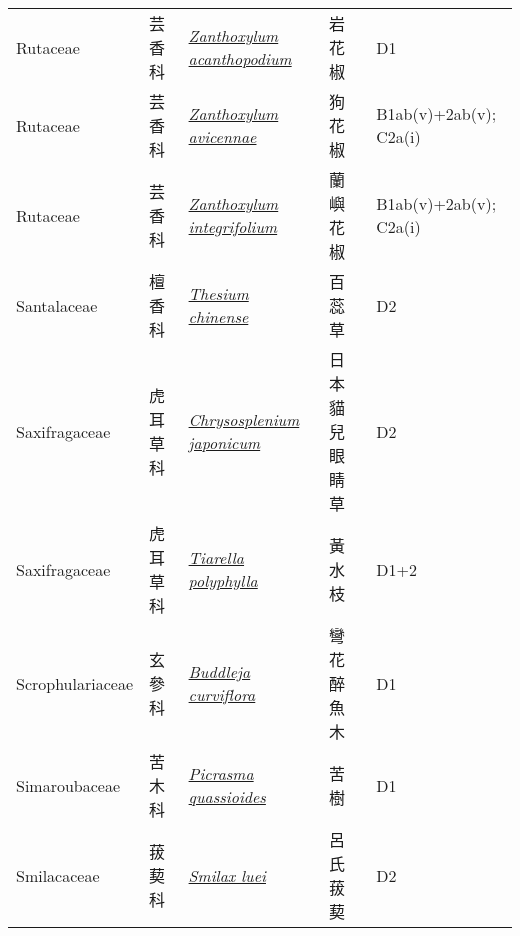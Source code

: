 {\begin{longtable}{L{2.5cm}L{2cm}L{5cm}L{2.5cm}L{3cm}}
    Rutaceae & 芸香科 & \href{http://www.theplantlist.org/tpl1.1/search?q=Zanthoxylum+acanthopodium}{\textit{Zanthoxylum acanthopodium} } & 岩花椒 & D1    \\
    Rutaceae & 芸香科 & \href{http://www.theplantlist.org/tpl1.1/search?q=Zanthoxylum+avicennae}{\textit{Zanthoxylum avicennae} } & 狗花椒 & B1ab(v)+2ab(v); C2a(i)    \\
    Rutaceae & 芸香科 & \href{http://www.theplantlist.org/tpl1.1/search?q=Zanthoxylum+integrifolium}{\textit{Zanthoxylum integrifolium} } & 蘭嶼花椒 & B1ab(v)+2ab(v); C2a(i)    \\
    Santalaceae & 檀香科 & \href{http://www.theplantlist.org/tpl1.1/search?q=Thesium+chinense}{\textit{Thesium chinense} } & 百蕊草 & D2    \\
    Saxifragaceae & 虎耳草科 & \href{http://www.theplantlist.org/tpl1.1/search?q=Chrysosplenium+japonicum}{\textit{Chrysosplenium japonicum} } & 日本貓兒眼睛草 & D2    \\
    Saxifragaceae & 虎耳草科 & \href{http://www.theplantlist.org/tpl1.1/search?q=Tiarella+polyphylla}{\textit{Tiarella polyphylla} } & 黃水枝 & D1+2    \\
    Scrophulariaceae & 玄參科 & \href{http://www.theplantlist.org/tpl1.1/search?q=Buddleja+curviflora}{\textit{Buddleja curviflora} } & 彎花醉魚木 & D1    \\
    Simaroubaceae & 苦木科 & \href{http://www.theplantlist.org/tpl1.1/search?q=Picrasma+quassioides}{\textit{Picrasma quassioides} } & 苦樹 & D1    \\
    Smilacaceae & 菝葜科 & \href{http://www.theplantlist.org/tpl1.1/search?q=Smilax+luei}{\textit{Smilax luei} } & 呂氏菝葜 & D2    \\

\end{longtable}}

